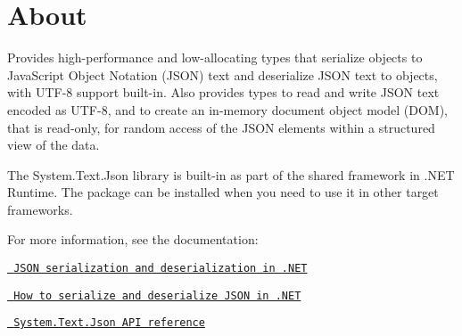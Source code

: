 \chapter{About}
\hypertarget{md_packages_2_system_8_text_8_json_87_80_80_2_r_e_a_d_m_e}{}\label{md_packages_2_system_8_text_8_json_87_80_80_2_r_e_a_d_m_e}
\label{md_packages_2_system_8_text_8_json_87_80_80_2_r_e_a_d_m_e_autotoc_md77}%
%
 Provides high-\/performance and low-\/allocating types that serialize objects to Java\+Script Object Notation (JSON) text and deserialize JSON text to objects, with UTF-\/8 support built-\/in. Also provides types to read and write JSON text encoded as UTF-\/8, and to create an in-\/memory document object model (DOM), that is read-\/only, for random access of the JSON elements within a structured view of the data.

The {\ttfamily System.\+Text.\+Json} library is built-\/in as part of the shared framework in .NET Runtime. The package can be installed when you need to use it in other target frameworks.

For more information, see the documentation\+:


\begin{DoxyItemize}
\item \href{https://docs.microsoft.com/dotnet/standard/serialization/system-text-json-overview}{\texttt{ JSON serialization and deserialization in .NET}}
\item \href{https://docs.microsoft.com/dotnet/standard/serialization/system-text-json-how-to}{\texttt{ How to serialize and deserialize JSON in .NET}}
\item \href{https://docs.microsoft.com/dotnet/api/system.text.json}{\texttt{ System.\+Text.\+Json API reference}} 
\end{DoxyItemize}